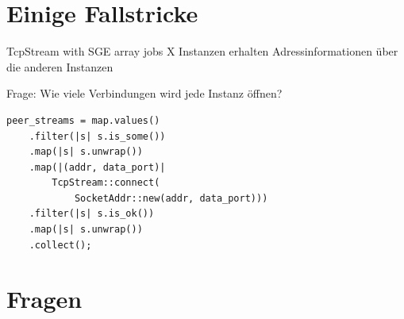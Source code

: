 \documentclass[aspectratio=1610,t]{beamer}
\begin{document}
{
\section{Einige Fallstricke}
}
\begin{frame}[fragile]{TcpStream with SGE array jobs}
X Instanzen erhalten Adressinformationen über die anderen Instanzen

Frage: Wie viele Verbindungen wird jede Instanz öffnen?
\begin{verbatim}
peer_streams = map.values()
    .filter(|s| s.is_some())
    .map(|s| s.unwrap())
    .map(|(addr, data_port)|
        TcpStream::connect(
            SocketAddr::new(addr, data_port)))
    .filter(|s| s.is_ok())
    .map(|s| s.unwrap())
    .collect();
\end{verbatim}
\end{frame}

{
\section{Fragen}
}




%
%
%





\end{document}
